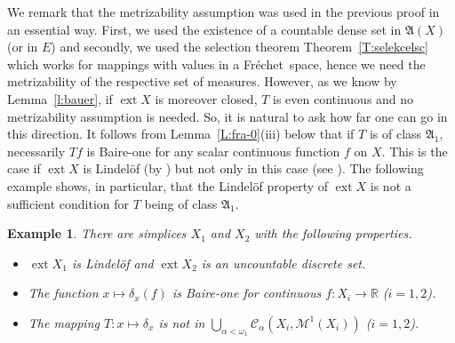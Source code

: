 \documentclass{amsart}
\numberwithin{equation}{section}
\newtheorem{example}[thm]{Example}
\theoremstyle{definition}
\def\fra{\mathfrak{A}}
\def\C{\mathcal C}
\def\M{\mathcal M}
\def\er{\mathbb R}
\def \ext {\operatorname{ext}}
\newcommand{\fr}{Fr\'echet\ }
\begin{document}
We remark that the metrizability assumption was used in the previous proof in an essential way.
First, we used the existence of a countable dense set in $\fra(X)$ (or in $E$) and secondly, we used the selection theorem Theorem~\ref{T:selekcelsc} which works for mappings with values in a \fr space,
hence we need the metrizability of the respective set of measures. However, as we know by Lemma~\ref{l:bauer}, if $\ext X$ is moreover closed, $T$ is even continuous and no metrizability assumption is needed. So, it is natural to ask how far one can go in this direction. It follows from Lemma~\ref{L:fra-0}(iii) below that if $T$ is of class $\fra_1$, necessarily $Tf$ is Baire-one for any scalar continuous function $f$ on $X$. This is the case if $\ext X$ is Lindel\"of (by \cite{Jel,lusp23,lusp-complex})
but not only in this case  (see  \cite[Theorem 4]{kalenda-bpms}). The following example shows, in particular, that the Lindel\"of property of $\ext X$ is not a sufficient condition for $T$ being of class $\fra_1$.

\begin{example}\label{ex:dikobraz}
There	are simplices $X_1$ and $X_2$ with the following properties.
\begin{itemize}
	\item[(a)] $\ext X_1$ is Lindel\"of and $\ext X_2$ is an uncountable discrete set.
	\item[(b)] The function $x\mapsto \delta_x(f)$ is Baire-one for continuous $f:X_i\to\er$ ($i=1,2$).
	\item[(c)] The mapping $T:x\mapsto \delta_x$ is not in $\bigcup_{\alpha<\omega_1}\C_\alpha(X_i,\M^1(X_i))$ ($i=1,2$).
\end{itemize}
\end{example}
\end{document}
